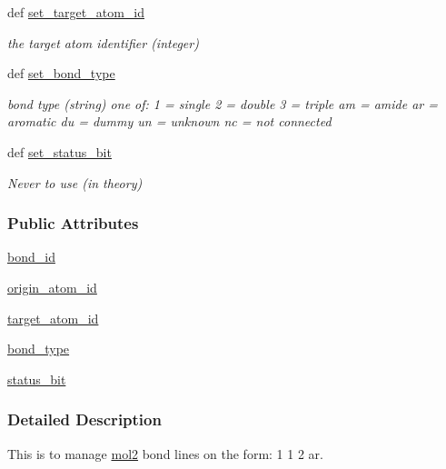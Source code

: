 \begin{DoxyCompactItemize}
def \hyperlink{classforcebalance_1_1Mol2_1_1mol2__bond_afbc8421033001dbf5d29cccee1f503e3}{set\-\_\-target\-\_\-atom\-\_\-id}
\begin{DoxyCompactList}\small\item\em the target atom identifier (integer) \end{DoxyCompactList}\item 
def \hyperlink{classforcebalance_1_1Mol2_1_1mol2__bond_a1ced365259f0c6b7b4fa0f0d9fc5dc4d}{set\-\_\-bond\-\_\-type}
\begin{DoxyCompactList}\small\item\em bond type (string) one of\-: 1 = single 2 = double 3 = triple am = amide ar = aromatic du = dummy un = unknown nc = not connected \end{DoxyCompactList}\item 
def \hyperlink{classforcebalance_1_1Mol2_1_1mol2__bond_a1c2a0d5ae943de6bd80b4e32e956b09a}{set\-\_\-status\-\_\-bit}
\begin{DoxyCompactList}\small\item\em \-Never to use (in theory) \end{DoxyCompactList}\end{DoxyCompactItemize}
\subsubsection*{\-Public \-Attributes}
\begin{DoxyCompactItemize}
\item 
\hyperlink{classforcebalance_1_1Mol2_1_1mol2__bond_af90c10f054d8457e7d7dbae91fca1d3f}{bond\-\_\-id}
\item 
\hyperlink{classforcebalance_1_1Mol2_1_1mol2__bond_af71cffabfedf3dc460819570062d5971}{origin\-\_\-atom\-\_\-id}
\item 
\hyperlink{classforcebalance_1_1Mol2_1_1mol2__bond_ae65675970bd6b63a9f3c76f23ac5ebfb}{target\-\_\-atom\-\_\-id}
\item 
\hyperlink{classforcebalance_1_1Mol2_1_1mol2__bond_af47d6696dd015c086cba7d5704aeeb92}{bond\-\_\-type}
\item 
\hyperlink{classforcebalance_1_1Mol2_1_1mol2__bond_a2fc8dbc0491b8295c8f7cb666f39b5a5}{status\-\_\-bit}
\end{DoxyCompactItemize}


\subsubsection{\-Detailed \-Description}
\-This is to manage \hyperlink{classforcebalance_1_1Mol2_1_1mol2}{mol2} bond lines on the form\-: 1 1 2 ar. 

